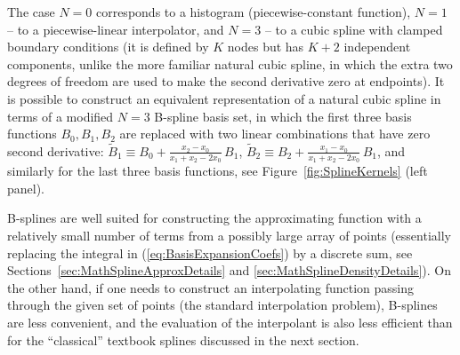 \documentclass[12pt]{article}
\begin{document}
The case $N=0$ corresponds to a histogram (piecewise-constant function), $N=1$ -- to a piecewise-linear interpolator, and $N=3$ -- to a cubic spline with clamped boundary conditions (it is defined by $K$ nodes but has $K+2$ independent components, unlike the more familiar natural cubic spline, in which the extra two degrees of freedom are used to make the second derivative zero at endpoints). It is possible to construct an equivalent representation of a natural cubic spline in terms of a modified $N=3$ B-spline basis set, in which the first three basis functions $B_0, B_1, B_2$ are replaced with two linear combinations that have zero second derivative: $\tilde B_1 \equiv B_0 + \frac{x_2-x_0}{x_1+x_2-2x_0}\,B_1$, $\tilde B_2 \equiv B_2 + \frac{x_1-x_0}{x_1+x_2-2x_0}\,B_1$, and similarly for the last three basis functions, see Figure~\ref{fig:SplineKernels} (left panel).

B-splines are well suited for constructing the approximating function with a relatively small number of terms from a possibly large array of points (essentially replacing the integral in (\ref{eq:BasisExpansionCoefs}) by a discrete sum, see Sections~\ref{sec:MathSplineApproxDetails} and \ref{sec:MathSplineDensityDetails}). %
On the other hand, if one needs to construct an interpolating function passing through the given set of points (the standard interpolation problem), B-splines are less convenient, and the evaluation of the interpolant is also less efficient than for the ``classical'' textbook splines discussed in the next section.
\end{document}
